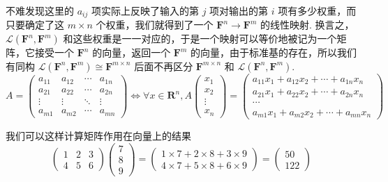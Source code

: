 不难发现这里的 $a_{ij}$ 项实际上反映了输入的第 $j$ 项对输出的第 $i$ 项有多少权重，而只要确定了这 $m\times n$ 个权重，我们就得到了一个 $\mathbf{F}^n\to\mathbf{F}^m$ 的线性映射. 换言之，$\mathcal{L}(\mathbf{F}^n, \mathbf{F}^m)$ 和这些权重是一一对应的，于是一个映射可以等价地被记为一个矩阵，它接受一个 $\mathbf{F}^n$ 的向量，返回一个 $\mathbf{F}^m$ 的向量，由于标准基的存在，所以我们有同构 $\mathcal{L}(\mathbf{F}^n, \mathbf{F}^m) \cong \mathbf{F}^{m\times n}$ 后面不再区分 $\mathbf{F}^{m\times n}$ 和 $\mathcal{L}(\mathbf{F}^n, \mathbf{F}^m)$.
\[
    A = \begin{pmatrix}
        a_{11} & a_{12} & \cdots & a_{1n} \\
        a_{21} & a_{22} & \cdots & a_{2n} \\
        \vdots & \vdots & \ddots & \vdots \\
        a_{m1} & a_{m2} & \cdots & a_{mn}
    \end{pmatrix} \iff \forall x\in\mathbf{R}^n,
    A \begin{pmatrix}
        x_1 \\ x_2 \\ \vdots \\ x_n
    \end{pmatrix} = \begin{pmatrix}
        a_{11} x_1 + a_{12} x_2 + \cdots + a_{1n} x_n \\
        a_{21} x_1 + a_{22} x_2 + \cdots + a_{2n} x_n \\
        \cdots\\
        a_{m1} x_1 + a_{m2} x_2 + \cdots + a_{mn} x_n
    \end{pmatrix}
\]

我们可以这样计算矩阵作用在向量上的结果
\[
    \begin{pmatrix}
        1 & 2 & 3 \\ 4 & 5 & 6
    \end{pmatrix} \begin{pmatrix}
        7 \\ 8 \\ 9
    \end{pmatrix} = \begin{pmatrix}
        1\times 7 + 2\times 8 + 3\times 9 \\
        4 \times 7 + 5\times 8 + 6\times 9
    \end{pmatrix} = \begin{pmatrix}
        50 \\ 122
    \end{pmatrix}
\]

